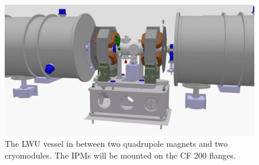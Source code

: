 \begin{figure}[ht]
	\includegraphics[width=\textwidth]{03_Prototype/figures/00_fig/fig016_LWU_Cryo.jpeg}
	\caption[The LWU vessel in between two quadrupole magnets and two cryomodules]{The LWU vessel in between two quadrupole magnets and two cryomodules. The IPMs will be mounted on the CF 200 flanges. \color{red}{[Changer l'image car elle n'est pas à jours ...]}}
	\label{chap3:LWU_Cryo}
\end{figure}
